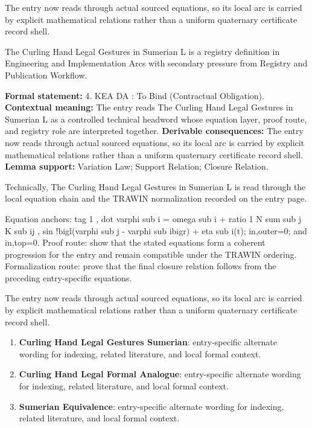 The entry now reads through actual sourced equations, so its local arc is carried by explicit mathematical relations rather than a uniform quaternary certificate record shell.
\clearpage


\begingroup\small
{}
The Curling Hand Legal Gestures in Sumerian L is a registry definition in Engineering and Implementation Arcs with secondary pressure from Registry and Publication Workflow.

\begingroup\footnotesize\setlength{\emergencystretch}{3em}\sloppy
\textbf{Formal statement:} 4. KEA DA : To Bind (Contractual Obligation). \textbf{Contextual meaning:} The entry reads The Curling Hand Legal Gestures in Sumerian L as a controlled technical headword whose equation layer, proof route, and registry role are interpreted together. \textbf{Derivable consequences:} The entry now reads through actual sourced equations, so its local arc is carried by explicit mathematical relations rather than a uniform quaternary certificate record shell. \textbf{Lemma support:} Variation Law; Support Relation; Closure Relation.\par
\endgroup

Technically, The Curling Hand Legal Gestures in Sumerian L is read through the local equation chain and the TRAWIN normalization recorded on the entry page.

Equation anchors: tag 1 , dot varphi sub i = omega sub i + ratio 1 N sum sub j K sub ij , sin !bigl(varphi sub j - varphi sub ibigr) + eta sub i(t); in,outer=0; and in,top=0. Proof route: show that the stated equations form a coherent progression for the entry and remain compatible under the TRAWIN ordering. Formalization route: prove that the final closure relation follows from the preceding entry-specific equations.

The entry now reads through actual sourced equations, so its local arc is carried by explicit mathematical relations rather than a uniform quaternary certificate record shell.
\endgroup

\begin{enumerate}[leftmargin=1.6em,itemsep=6pt,topsep=4pt]
\item \textbf{Curling Hand Legal Gestures Sumerian}: entry-specific alternate wording for indexing, related literature, and local formal context.
\item \textbf{Curling Hand Legal Formal Analogue}: entry-specific alternate wording for indexing, related literature, and local formal context.
\item \textbf{Sumerian Equivalence}: entry-specific alternate wording for indexing, related literature, and local formal context.
\end{enumerate}


